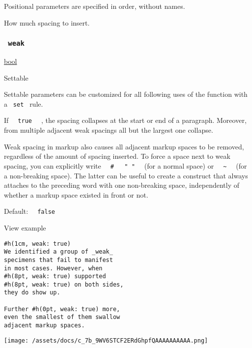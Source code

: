 \label{parameters-amount-positional-tooltip}
Positional parameters are specified in order, without names.

How much spacing to insert.

\subsubsection{\texorpdfstring{\texttt{\ weak\ }}{ weak }}\label{parameters-weak}

\href{/docs/reference/foundations/bool/}{bool}

{{ Settable }}

\label{parameters-weak-settable-tooltip}
Settable parameters can be customized for all following uses of the
function with a \texttt{\ set\ } rule.

If \texttt{\ }{\texttt{\ true\ }}\texttt{\ } , the spacing collapses at
the start or end of a paragraph. Moreover, from multiple adjacent weak
spacings all but the largest one collapse.

Weak spacing in markup also causes all adjacent markup spaces to be
removed, regardless of the amount of spacing inserted. To force a space
next to weak spacing, you can explicitly write
\texttt{\ }{\texttt{\ \#\ }}\texttt{\ }{\texttt{\ "\ "\ }}\texttt{\ }
(for a normal space) or
\texttt{\ }{\texttt{\ \textasciitilde{}\ }}\texttt{\ } (for a
non-breaking space). The latter can be useful to create a construct that
always attaches to the preceding word with one non-breaking space,
independently of whether a markup space existed in front or not.

Default: \texttt{\ }{\texttt{\ false\ }}\texttt{\ }


View example

\begin{verbatim}
#h(1cm, weak: true)
We identified a group of _weak_
specimens that fail to manifest
in most cases. However, when
#h(8pt, weak: true) supported
#h(8pt, weak: true) on both sides,
they do show up.

Further #h(0pt, weak: true) more,
even the smallest of them swallow
adjacent markup spaces.
\end{verbatim}

\texttt{[image: /assets/docs/c\_7b\_9WV6STCF2ERdGhpfQAAAAAAAAAA.png]}

\href{/docs/reference/layout/skew/}{\pandocbounded{}}

